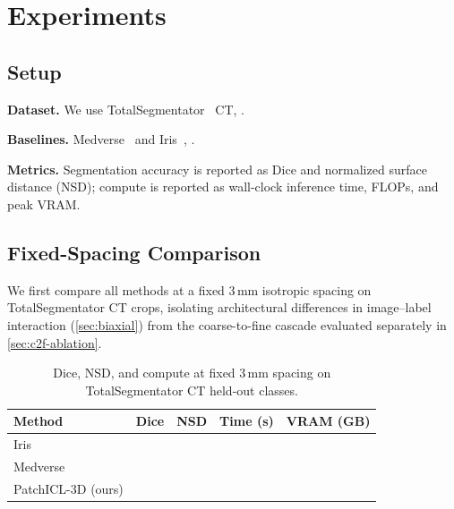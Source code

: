 \section{Experiments}
\label{sec:experiments}

\subsection{Setup}
\label{sec:setup}

\noindent\textbf{Dataset.} We use
TotalSegmentator~\cite{wasserthalTotalSegmentatorRobustSegmentation2023}
CT, .

\noindent\textbf{Baselines.} Medverse~\cite{huMedverseUniversalModel2025a}
and Iris~\cite{gaoShowSegmentUniversal2025}, .

\noindent\textbf{Metrics.} Segmentation accuracy is reported as Dice and
normalized surface distance (NSD); compute is reported as wall-clock
inference time, FLOPs, and peak VRAM.

\subsection{Fixed-Spacing Comparison}
\label{sec:fixed-spacing}

We first compare all methods at a fixed 3\,mm isotropic spacing on
TotalSegmentator CT crops, isolating architectural differences in
image--label interaction (\cref{sec:biaxial}) from the coarse-to-fine
cascade evaluated separately in \cref{sec:c2f-ablation}.

\begin{table}[t]
\centering
\caption{Dice, NSD, and compute at fixed 3\,mm spacing on
TotalSegmentator CT held-out classes. }
\label{tab:fixed-spacing}
\small
\begin{tabular}{@{}lcccc@{}}
\toprule
Method & Dice & NSD & Time (s) & VRAM (GB) \\
\midrule
Iris & \TODO{} & \TODO{} & \TODO{} & \TODO{} \\
Medverse & \TODO{} & \TODO{} & \TODO{} & \TODO{} \\
PatchICL-3D (ours) & \TODO{} & \TODO{} & \TODO{} & \TODO{} \\
\bottomrule
\end{tabular}
\end{table}

